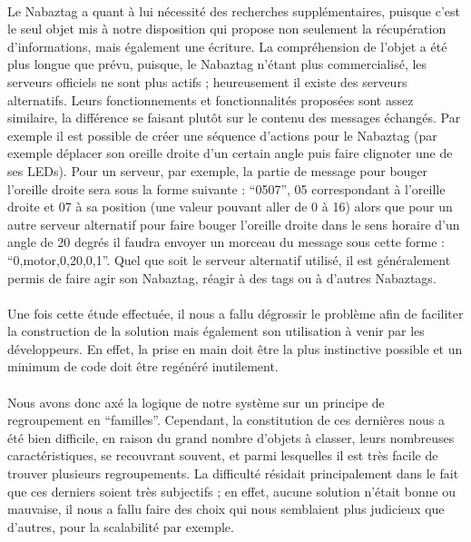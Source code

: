 \documentclass[nocopyrightspace]{sigplanconf}
\begin{document}
		\paragraph{}
		Le Nabaztag\cite{nabaztag} a quant à lui nécessité des recherches supplémentaires, puisque c’est le seul objet mis à notre disposition qui propose non seulement la récupération d’informations, mais également une écriture. La compréhension de l’objet a été plus longue que prévu, puisque, le Nabaztag n’étant plus commercialisé, les serveurs officiels ne sont plus actifs ; heureusement il existe des serveurs alternatifs. Leurs fonctionnements et fonctionnalités proposées sont assez similaire, la différence se faisant plutôt sur le contenu des messages échangés. Par exemple il est possible de créer une séquence d’actions pour le Nabaztag (par exemple déplacer son oreille droite d’un certain angle puis faire clignoter une de ses LEDs). Pour un serveur, par exemple, la partie de message pour bouger l’oreille droite sera sous la forme suivante : “0507”, 05 correspondant à l’oreille droite et 07 à sa position (une valeur pouvant aller de 0 à 16) alors que pour un autre serveur alternatif pour faire bouger l’oreille droite dans le sens horaire d’un angle de 20 degrés il faudra envoyer un morceau du message sous cette forme : “0,motor,0,20,0,1”. Quel que soit le serveur alternatif utilisé, il est généralement permis de faire agir son Nabaztag, réagir à des tags ou à d’autres Nabaztags.

		\paragraph{}
		Une fois cette étude effectuée, il nous a fallu dégrossir le problème afin de faciliter la construction de la solution mais également son utilisation à venir par les développeurs. En effet, la prise en main doit être la plus instinctive possible et un minimum de code doit être regénéré inutilement.

		\paragraph{}
		Nous avons donc axé la logique de notre système sur un principe de regroupement en “familles”. Cependant, la constitution de ces dernières nous a été bien difficile, en raison du grand nombre d’objets à classer, leurs nombreuses caractéristiques, se recouvrant souvent, et parmi lesquelles il est très facile de trouver plusieurs regroupements. La difficulté résidait principalement dans le fait que ces derniers soient très subjectifs ; en effet, aucune solution n’était bonne ou mauvaise, il nous a fallu faire des choix qui nous semblaient plus judicieux que d’autres, pour la scalabilité par exemple.
\end{document}
